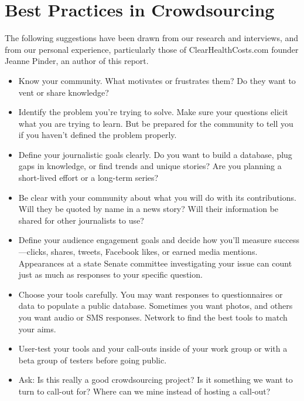 \documentclass[notoc, symmetric, nobib, nols]{towcenter-guideto-book}
\begin{document}
\section{Best Practices in Crowdsourcing} 

The following suggestions have been drawn from our research and interviews, and from our personal experience, particularly those of ClearHealthCosts.com founder Jeanne Pinder, an author of this report. 
\begin{itemize}
\item Know your community. What motivates or frustrates them? Do they want to vent or share knowledge?

\item Identify the problem you're trying to solve. Make sure your questions elicit what you are trying to learn. But be prepared for the community to tell you if you haven't defined the problem properly.

\item Define your journalistic goals clearly. Do you want to build a database, plug gaps in knowledge, or find trends and unique stories? Are you planning a short-lived effort or a long-term series?

\item Be clear with your community about what you will do with its contributions. Will they be quoted by name in a news story? Will their information be shared for other journalists to use?

\item Define your audience engagement goals and decide how you'll measure success---clicks, shares, tweets, Facebook likes, or earned media mentions. Appearances at a state Senate committee investigating your issue can count just as much as responses to your specific question. 

\item Choose your tools carefully. You may want responses to questionnaires or data to populate a public database. Sometimes you want photos, and others you want audio or SMS responses. Network to find the best tools to match your aims.

\item User-test your tools and your call-outs inside of your work group or with a beta group of testers before going public.

\item Ask: Is this really a good crowdsourcing project? Is it something we want to turn to call-out for? Where can we mine instead of hosting a call-out?


\end{itemize}
\end{document}
